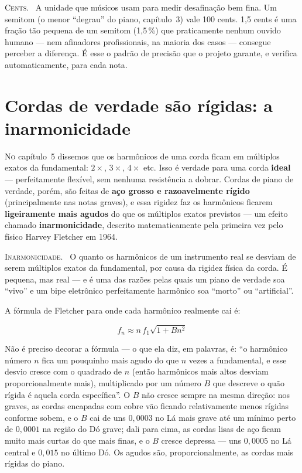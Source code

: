 \documentclass[11pt,oneside]{book}
\newcommand{\nova}[1]{\textsc{\color{accent}#1.}~}
\newcommand{\opening}[2]{\lettrine[lines=2,loversize=0.08,lraise=0.02]{#1}{#2}}
\begin{document}
\begin{newword}
\nova{Cents} A unidade que músicos usam para medir desafinação bem fina.
Um semitom (o menor \enquote{degrau} do piano, capítulo~3) vale 100 cents.
1,5 cents é uma fração tão pequena de um semitom (1,5\,\%) que praticamente
nenhum ouvido humano --- nem afinadores profissionais, na maioria dos casos
--- consegue perceber a diferença. É esse o padrão de precisão que o
projeto garante, e verifica automaticamente, para cada nota.
\end{newword}

\chapter{Cordas de verdade são rígidas: a inarmonicidade}

\opening{N}{o} capítulo~5 dissemos que os harmônicos de uma corda ficam em
múltiplos exatos da fundamental: $2\times$, $3\times$, $4\times$ etc. Isso
é verdade para uma corda \textbf{ideal} --- perfeitamente flexível, sem
nenhuma resistência a dobrar. Cordas de piano de verdade, porém, são feitas
de \textbf{aço grosso e razoavelmente rígido} (principalmente nas notas
graves), e essa rigidez faz os harmônicos ficarem \textbf{ligeiramente mais
agudos} do que os múltiplos exatos previstos --- um efeito chamado
\textbf{inarmonicidade}, descrito matematicamente pela primeira vez pelo
físico Harvey Fletcher em 1964.

\begin{newword}
\nova{Inarmonicidade} O quanto os harmônicos de um instrumento real se
desviam de serem múltiplos exatos da fundamental, por causa da rigidez
física da corda. É pequena, mas real --- e é uma das razões pelas quais um
piano de verdade soa \enquote{vivo} e um bipe eletrônico perfeitamente
harmônico soa \enquote{morto} ou \enquote{artificial}.
\end{newword}

A fórmula de Fletcher para onde cada harmônico realmente cai é:

\[
f_n \approx n \, f_1 \sqrt{1 + B n^2}
\]

Não é preciso decorar a fórmula --- o que ela diz, em palavras, é: \enquote{o
harmônico número $n$ fica um pouquinho mais agudo do que $n$ vezes a
fundamental, e esse desvio cresce com o quadrado de $n$ (então harmônicos
mais altos desviam proporcionalmente mais), multiplicado por um número $B$
que descreve o quão rígida é aquela corda específica}. O $B$ não cresce
sempre na mesma direção: nos graves, as cordas encapadas com cobre vão
ficando relativamente menos rígidas conforme sobem, e o $B$ cai de uns
$0{,}0003$ no Lá mais grave até um mínimo perto de $0{,}0001$ na região do
Dó grave; dali para cima, as cordas lisas de aço ficam muito mais curtas do
que mais finas, e o $B$ cresce depressa --- uns $0{,}0005$ no Lá central e
$0{,}015$ no último Dó. Os agudos são, proporcionalmente, as cordas mais
rígidas do piano.
\end{document}
